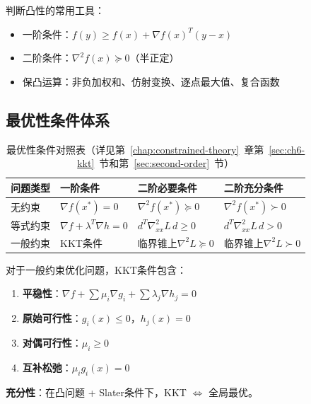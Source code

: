 判断凸性的常用工具：
\begin{itemize}
    \item 一阶条件：$f(y) \geq f(x) + \nabla f(x)^T(y-x)$
    \item 二阶条件：$\nabla^2 f(x) \succcurlyeq 0$（半正定）
    \item 保凸运算：非负加权和、仿射变换、逐点最大值、复合函数
\end{itemize}

\subsection{最优性条件体系}

\begin{table}[H]
\centering
\small
\caption{最优性条件对照表（详见第~\ref{chap:constrained-theory}~章第~\ref{sec:ch6-kkt}~节和第~\ref{sec:second-order}~节）}\label{tab:optimality}
\begin{tabular}{@{}>{\raggedright\arraybackslash}p{2cm}>{\raggedright\arraybackslash}p{3.5cm}>{\raggedright\arraybackslash}p{3.5cm}>{\raggedright\arraybackslash}p{3.5cm}@{}}
\toprule
\textbf{问题类型} & \textbf{一阶条件} & \textbf{二阶必要条件} & \textbf{二阶充分条件} \\
\midrule
无约束 & $\nabla f(x^*) = 0$ & $\nabla^2 f(x^*) \succcurlyeq 0$ & $\nabla^2 f(x^*) \succ 0$ \\
等式约束 & $\nabla f + \lambda^T \nabla h = 0$ & $d^T \nabla^2_{xx} L \, d \geq 0$ & $d^T \nabla^2_{xx} L \, d > 0$ \\
一般约束 & KKT条件 & 临界锥上$\nabla^2 L \succcurlyeq 0$ & 临界锥上$\nabla^2 L \succ 0$ \\
\bottomrule
\end{tabular}
\end{table}

\begin{kktbox}
对于一般约束优化问题，KKT条件包含：
\begin{enumerate}
    \item \textbf{平稳性}：$\nabla f + \sum \mu_i \nabla g_i + \sum \lambda_j \nabla h_j = 0$
    \item \textbf{原始可行性}：$g_i(x) \leq 0$，$h_j(x) = 0$
    \item \textbf{对偶可行性}：$\mu_i \geq 0$
    \item \textbf{互补松弛}：$\mu_i g_i(x) = 0$
\end{enumerate}
\textbf{充分性}：在凸问题 + Slater条件下，KKT $\Leftrightarrow$ 全局最优。
\end{kktbox}

